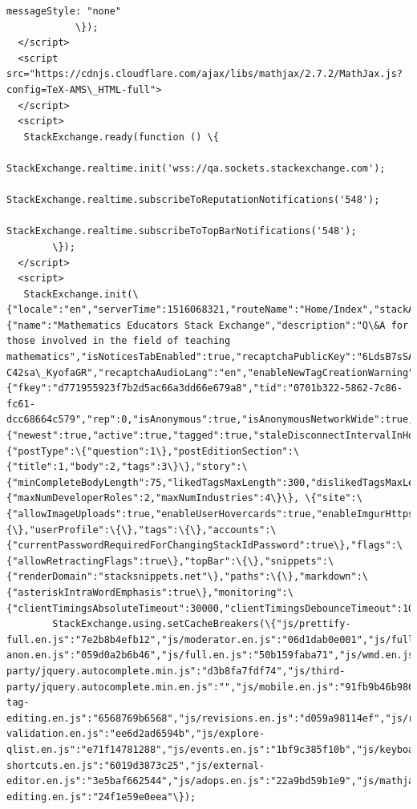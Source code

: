 \documentclass[11pt]{article}
\begin{document}
\begin{Verbatim}[commandchars=\\\{\}]
                    messageStyle: "none"
            \});
  </script>
  <script src="https://cdnjs.cloudflare.com/ajax/libs/mathjax/2.7.2/MathJax.js?config=TeX-AMS\_HTML-full">
  </script>
  <script>
   StackExchange.ready(function () \{
            StackExchange.realtime.init('wss://qa.sockets.stackexchange.com');
            StackExchange.realtime.subscribeToReputationNotifications('548');
                StackExchange.realtime.subscribeToTopBarNotifications('548');
        \});
  </script>
  <script>
   StackExchange.init(\{"locale":"en","serverTime":1516068321,"routeName":"Home/Index","stackAuthUrl":"https://stackauth.com","networkMetaHostname":"meta.stackexchange.com","site":\{"name":"Mathematics Educators Stack Exchange","description":"Q\&A for those involved in the field of teaching mathematics","isNoticesTabEnabled":true,"recaptchaPublicKey":"6LdsB7sSAAAAAAzjgEF\_Hd8vXv-C42sa\_KyofaGR","recaptchaAudioLang":"en","enableNewTagCreationWarning":false,"insertSpaceAfterNameTabCompletion":false,"id":548,"childUrl":"https://matheducators.meta.stackexchange.com","enableSocialMediaInSharePopup":true,"protocol":"https"\},"user":\{"fkey":"d771955923f7b2d5ac66a3dd66e679a8","tid":"0701b322-5862-7c86-fc61-dcc68664c579","rep":0,"isAnonymous":true,"isAnonymousNetworkWide":true,"canSeeNewHeaderDesign":true\},"realtime":\{"newest":true,"active":true,"tagged":true,"staleDisconnectIntervalInHours":0,"workerIframeDomain":"https://cdn.sstatic.net"\},"events":\{"postType":\{"question":1\},"postEditionSection":\{"title":1,"body":2,"tags":3\}\},"story":\{"minCompleteBodyLength":75,"likedTagsMaxLength":300,"dislikedTagsMaxLength":300\},"jobPreferences":\{"maxNumDeveloperRoles":2,"maxNumIndustries":4\}\}, \{"site":\{"allowImageUploads":true,"enableUserHovercards":true,"enableImgurHttps":true,"forceHttpsImages":true\},"comments":\{\},"userProfile":\{\},"tags":\{\},"accounts":\{"currentPasswordRequiredForChangingStackIdPassword":true\},"flags":\{"allowRetractingFlags":true\},"topBar":\{\},"snippets":\{"renderDomain":"stacksnippets.net"\},"paths":\{\},"markdown":\{"asteriskIntraWordEmphasis":true\},"monitoring":\{"clientTimingsAbsoluteTimeout":30000,"clientTimingsDebounceTimeout":1000\}\});
        StackExchange.using.setCacheBreakers(\{"js/prettify-full.en.js":"7e2b8b4efb12","js/moderator.en.js":"06d1dab0e001","js/full-anon.en.js":"059d0a2b6b46","js/full.en.js":"50b159faba71","js/wmd.en.js":"2d1624a29c03","js/third-party/jquery.autocomplete.min.js":"d3b8fa7fdf74","js/third-party/jquery.autocomplete.min.en.js":"","js/mobile.en.js":"91fb9b46b986","js/help.en.js":"a9d821110060","js/tageditor.en.js":"4f83add90c55","js/tageditornew.en.js":"f96d3bb8fe70","js/inline-tag-editing.en.js":"6568769b6568","js/revisions.en.js":"d059a98114ef","js/review.en.js":"bf50f86e4b67","js/tagsuggestions.en.js":"d1ff9b84abe5","js/post-validation.en.js":"ee6d2ad6594b","js/explore-qlist.en.js":"e71f14781288","js/events.en.js":"1bf9c385f10b","js/keyboard-shortcuts.en.js":"6019d3873c25","js/external-editor.en.js":"3e5baf662544","js/adops.en.js":"22a9bd59b1e9","js/mathjax-editing.en.js":"24f1e59e0eea"\});

\end{Verbatim}
\end{document}
